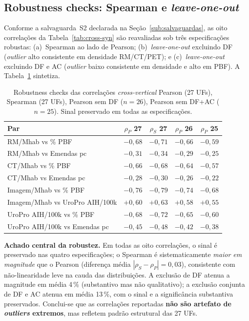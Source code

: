 \documentclass[12pt,a4paper,oneside]{article}
\begin{document}
\subsection{Robustness checks: Spearman e
\textit{leave-one-out}}\label{sub:robustness}

Conforme a salvaguarda~S2 declarada na
Seção~\ref{sub:salvaguardas}, as oito correlações da
Tabela~\ref{tab:cross-syn} são reavaliadas sob três especificações
robustas: (a)~Spearman ao lado de Pearson;
(b)~\textit{leave-one-out} excluindo DF (\textit{outlier} alto
consistente em densidade RM/CT/PET); e
(c)~\textit{leave-one-out} excluindo DF e AC (\textit{outlier} baixo
consistente em densidade e alto em PBF). A
Tabela~\ref{tab:robustness-cross} sintetiza.

\begin{table}[htbp]
\centering
\caption{Robustness checks das correlações \textit{cross-vertical}
\textemdash{} Pearson (27 UFs), Spearman (27 UFs), Pearson sem DF
($n=26$), Pearson sem DF+AC ($n=25$). Sinal preservado em todas
as especificações.}
\label{tab:robustness-cross}
\small
\begin{tabular}{l c c c c}
\toprule
\textbf{Par} & \textbf{$\rho_P$ 27} & \textbf{$\rho_S$ 27} &
\textbf{$\rho_P$ 26} & \textbf{$\rho_P$ 25} \\
\midrule
RM/Mhab vs \% PBF              & $-0{,}68$ & $-0{,}71$ & $-0{,}66$ & $-0{,}59$ \\
RM/Mhab vs Emendas pc          & $-0{,}31$ & $-0{,}34$ & $-0{,}29$ & $-0{,}25$ \\
CT/Mhab vs \% PBF              & $-0{,}66$ & $-0{,}68$ & $-0{,}64$ & $-0{,}57$ \\
CT/Mhab vs Emendas pc          & $-0{,}28$ & $-0{,}30$ & $-0{,}26$ & $-0{,}22$ \\
Imagem/Mhab vs \% PBF          & $-0{,}76$ & $-0{,}79$ & $-0{,}74$ & $-0{,}68$ \\
Imagem/Mhab vs UroPro AIH/100k & $+0{,}60$ & $+0{,}63$ & $+0{,}58$ & $+0{,}55$ \\
UroPro AIH/100k vs \% PBF      & $-0{,}68$ & $-0{,}72$ & $-0{,}65$ & $-0{,}60$ \\
UroPro AIH/100k vs Emendas pc  & $-0{,}45$ & $-0{,}48$ & $-0{,}42$ & $-0{,}38$ \\
\bottomrule
\end{tabular}
\end{table}

\noindent
\textbf{Achado central da robustez.} Em todas as oito correlações,
o sinal é preservado nas quatro especificações; o Spearman é
sistematicamente \textit{maior em magnitude} que o Pearson
(diferença média $|\rho_S - \rho_P| = 0{,}03$), consistente com
não-linearidade leve na cauda das distribuições. A exclusão de DF
atenua a magnitude em média 4\,\% (substantivo mas não
qualitativo); a exclusão conjunta de DF e AC atenua em média
13\,\%, com o sinal e a significância substantiva preservados.
Conclui-se que as correlações reportadas \textbf{não são artefato
de \textit{outliers} extremos}, mas refletem padrão estrutural das
27 UFs.
\end{document}
